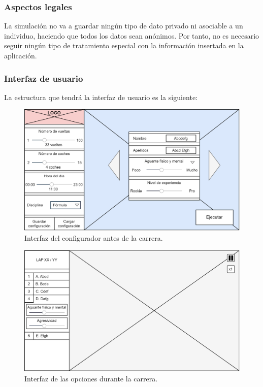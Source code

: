 \subsubsection{Aspectos legales}

La simulación no va a guardar ningún tipo de dato privado ni asociable a un individuo, haciendo que todos los datos sean anónimos. Por tanto, no es necesario seguir ningún tipo de tratamiento especial con la información insertada en la aplicación.

\subsubsection{Interfaz de usuario}

La estructura que tendrá la interfaz de usuario es la siguiente:

\begin{figure}[H]
    \centering
    \includegraphics[width=\textwidth]{imagenes/pag1.png}
    \caption{Interfaz del configurador antes de la carrera.}
 \end{figure}

 \begin{figure}[H]
    \centering
    \includegraphics[width=\textwidth]{imagenes/pag2.png}
    \caption{Interfaz de las opciones durante la carrera.}
 \end{figure}
